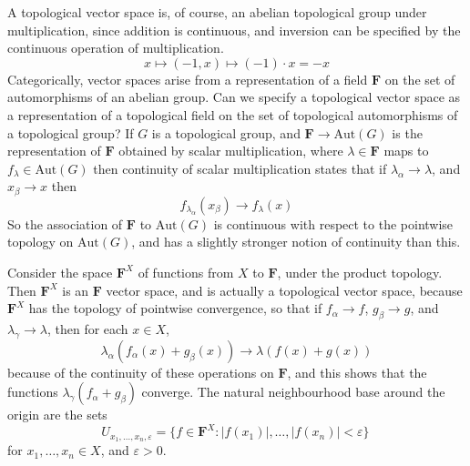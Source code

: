 A topological vector space is, of course, an abelian topological group under multiplication, since addition is continuous, and inversion can be specified by the continuous operation of multiplication.
%
\[ x \mapsto (-1,x) \mapsto (-1) \cdot x = -x \]
%
Categorically, vector spaces arise from a representation of a field $\mathbf{F}$ on the set of automorphisms of an abelian group. Can we specify a topological vector space as a representation of a topological field on the set of topological automorphisms of a topological group? If $G$ is a topological group, and $\mathbf{F} \to \text{Aut}(G)$ is the representation of $\mathbf{F}$ obtained by scalar multiplication, where $\lambda \in \mathbf{F}$ maps to $f_\lambda \in \text{Aut}(G)$ then continuity of scalar multiplication states that if $\lambda_\alpha \to \lambda$, and $x_\beta \to x$ then
%
\[ f_{\lambda_\alpha}(x_\beta) \to f_\lambda(x) \]
%
So the association of $\mathbf{F}$ to $\text{Aut}(G)$ is continuous with respect to the pointwise topology on $\text{Aut}(G)$, and has a slightly stronger notion of continuity than this.

\begin{example}
    Consider the space $\mathbf{F}^X$ of functions from $X$ to $\mathbf{F}$, under the product topology. Then $\mathbf{F}^X$ is an $\mathbf{F}$ vector space, and is actually a topological vector space, because $\mathbf{F}^X$ has the topology of pointwise convergence, so that if $f_\alpha \to f$, $g_\beta \to g$, and $\lambda_\gamma \to \lambda$, then for each $x \in X$,
    \[ \lambda_\alpha (f_\alpha(x) + g_\beta(x)) \to \lambda( f(x) + g(x)) \]
    because of the continuity of these operations on $\mathbf{F}$, and this shows that the functions $\lambda_\gamma (f_\alpha + g_\beta)$ converge. The natural neighbourhood base around the origin are the sets
    \[ U_{x_1, \dots, x_n, \varepsilon} = \{ f \in \mathbf{F}^X : |f(x_1)|, \dots, |f(x_n)| < \varepsilon \}\ \]
    for $x_1, \dots, x_n \in X$, and $\varepsilon > 0$.
\end{example}

